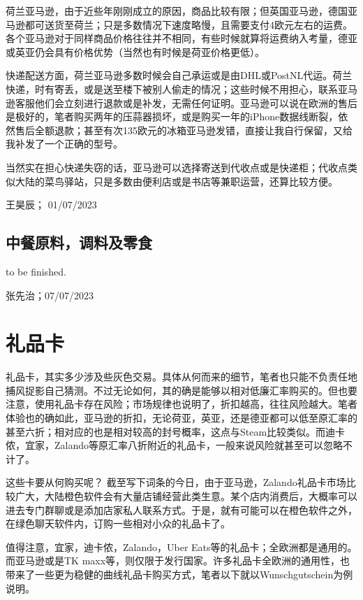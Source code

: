 荷兰亚马逊，由于近些年刚刚成立的原因，商品比较有限；但英国亚马逊，德国亚马逊都可送货至荷兰；只是多数情况下速度略慢，且需要支付4欧元左右的运费。各个亚马逊对于同样商品价格往往并不相同，有些时候就算将运费纳入考量，德亚或英亚仍会具有价格优势（当然也有时候是荷亚价格更低）。

快递配送方面，荷兰亚马逊多数时候会自己承运或是由DHL或PostNL代运。荷兰快递，时有寄丢，或是送至楼下被别人偷走的情况；这些时候不用担心，联系亚马逊客服他们会立刻进行退款或是补发，无需任何证明。亚马逊可以说在欧洲的售后是极好的，笔者购买两年的压蒜器损坏，或是购买一年的iPhone数据线断裂，依然售后全额退款；甚至有次135欧元的冰箱亚马逊发错，直接让我自行保留，又给我补发了一个正确的型号。

当然实在担心快递失窃的话，亚马逊可以选择寄送到代收点或是快递柜；代收点类似大陆的菜鸟驿站，只是多数由便利店或是书店等兼职运营，还算比较方便。
\begin{flushright}
王昊辰； 01/07/2023
\end{flushright}
\subsection{中餐原料，调料及零食}
to be finished.
\begin{flushright}
张先治；07/07/2023
\end{flushright}
\vspace{\betsubsec} %


\section{礼品卡}\hypertarget{礼品卡}{} 
礼品卡，其实多少涉及些灰色交易。具体从何而来的细节，笔者也只能不负责任地捕风捉影自己猜测。不过无论如何，其的确是能够以相对低廉汇率购买的。但也要注意，使用礼品卡存在风险；市场规律也说明了，折扣越高，往往风险越大。笔者体验也的确如此，亚马逊的折扣，无论荷亚，英亚，还是德亚都可以低至原汇率的甚至六折；相对应的也是相对较高的封号概率，这点与Steam比较类似。而迪卡侬，宜家，Zalando等原汇率八折附近的礼品卡，一般来说风险就甚至可以忽略不计了。

这些卡要从何购买呢？ 截至写下词条的今日，由于亚马逊，Zalando礼品卡市场比较广大，大陆橙色软件会有大量店铺经营此类生意。某个店内消费后，大概率可以进去专门群聊或是添加店家私人联系方式。于是，就有可能可以在橙色软件之外，在绿色聊天软件内，订购一些相对小众的礼品卡了。

值得注意，宜家，迪卡侬，Zalando，Uber Eats等的礼品卡；全欧洲都是通用的。而亚马逊或是TK maxx等，则仅限于发行国家。许多礼品卡全欧洲的通用性，也带来了一些更为稳健的曲线礼品卡购买方式，笔者以下就以Wunschgutschein为例说明。

